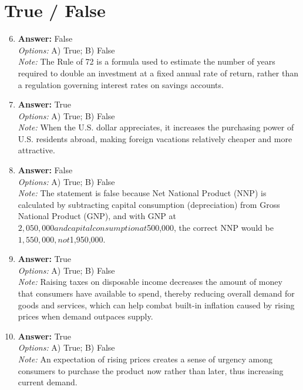 \documentclass[12pt]{article}
\begin{document}
\section*{True / False}
\begin{enumerate}[label=\arabic*.]
\setcounter{enumi}{5}
\item \textbf{Answer:} False
\\ \textit{Options:} A) True; B) False
\\ \textit{Note:} The Rule of 72 is a formula used to estimate the number of years required to double an investment at a fixed annual rate of return, rather than a regulation governing interest rates on savings accounts.
\item \textbf{Answer:} True
\\ \textit{Options:} A) True; B) False
\\ \textit{Note:} When the U.S. dollar appreciates, it increases the purchasing power of U.S. residents abroad, making foreign vacations relatively cheaper and more attractive.
\item \textbf{Answer:} False
\\ \textit{Options:} A) True; B) False
\\ \textit{Note:} The statement is false because Net National Product (NNP) is calculated by subtracting capital consumption (depreciation) from Gross National Product (GNP), and with GNP at $2,050,000 and capital consumption at $500,000, the correct NNP would be $1,550,000, not $1,950,000.
\item \textbf{Answer:} True
\\ \textit{Options:} A) True; B) False
\\ \textit{Note:} Raising taxes on disposable income decreases the amount of money that consumers have available to spend, thereby reducing overall demand for goods and services, which can help combat built-in inflation caused by rising prices when demand outpaces supply.
\item \textbf{Answer:} True
\\ \textit{Options:} A) True; B) False
\\ \textit{Note:} An expectation of rising prices creates a sense of urgency among consumers to purchase the product now rather than later, thus increasing current demand.
\end{enumerate}
\end{document}
